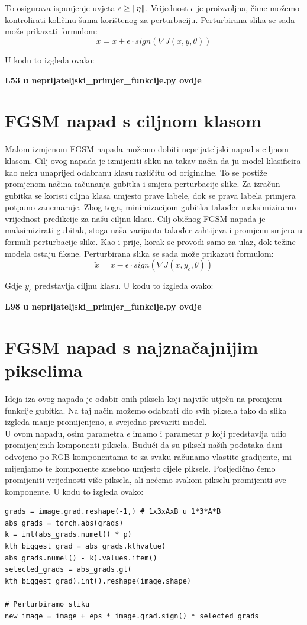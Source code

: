 To osigurava ispunjenje uvjeta $\epsilon \geq \left\|{\eta}\right\|$. Vrijednost $\epsilon$ je proizvoljna, čime možemo kontrolirati količinu šuma korištenog za perturbaciju. Perturbirana slika se sada može prikazati formulom: 
\[\widetilde{x} = x + \epsilon\cdot sign\left(\nabla J(x, y, \theta)\right)\]

U kodu to izgleda ovako:

\textbf{L53 u neprijateljski\_primjer\_funkcije.py ovdje}

\section{FGSM napad s ciljnom klasom}

Malom izmjenom FGSM napada možemo dobiti neprijateljski napad s ciljnom klasom. Cilj ovog napada je izmijeniti sliku na takav način da ju model klasificira kao neku unaprijed odabranu klasu različitu od originalne. To se postiže promjenom načina računanja gubitka i smjera perturbacije slike. Za izračun gubitka se koristi ciljna klasa umjesto prave labele, dok se prava labela primjera potpuno zanemaruje.  Zbog toga, minimizacijom gubitka također maksimiziramo vrijednost predikcije za našu ciljnu klasu. Cilj običnog FGSM napada je maksimizirati gubitak, stoga naša varijanta također zahtijeva i promjenu smjera u formuli perturbacije slike. Kao i prije, korak se provodi samo za ulaz, dok težine modela ostaju fiksne. Perturbirana slika se sada može prikazati formulom: 
\[\widetilde{x} = x - \epsilon\cdot sign\left(\nabla J(x, y_c, \theta)\right)\]

Gdje $y_c$ predstavlja ciljnu klasu. U kodu to izgleda ovako:

\textbf{L98 u neprijateljski\_primjer\_funkcije.py ovdje}

\section{FGSM napad s najznačajnijim pikselima}

Ideja iza ovog napada je odabir onih piksela koji najviše utječu na promjenu funkcije gubitka. Na taj način možemo odabrati dio svih piksela tako da slika izgleda manje promijenjeno, a svejedno prevariti model. \\
U ovom napadu, osim parametra $\epsilon$ imamo i parametar $p$ koji predstavlja udio promijenjenih komponenti piksela. Budući da su pikseli naših podataka dani odvojeno po RGB komponentama te za svaku računamo vlastite gradijente, mi mijenjamo te komponente zasebno umjesto cijele piksele. Posljedično ćemo promijeniti vrijednosti više piksela, ali nećemo svakom pikselu promijeniti sve komponente. U kodu to izgleda ovako:
\begin{verbatim}
grads = image.grad.reshape(-1,) # 1x3xAxB u 1*3*A*B
abs_grads = torch.abs(grads)
k = int(abs_grads.numel() * p)
kth_biggest_grad = abs_grads.kthvalue(
abs_grads.numel() - k).values.item()
selected_grads = abs_grads.gt(
kth_biggest_grad).int().reshape(image.shape)

# Perturbiramo sliku
new_image = image + eps * image.grad.sign() * selected_grads
\end{verbatim}

